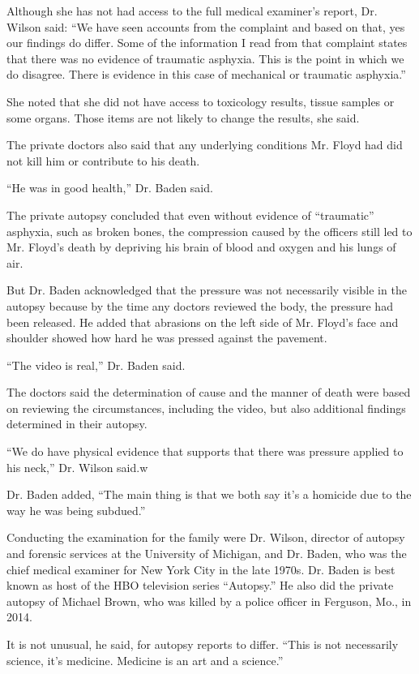 Although she has not had access to the full medical examiner's report,
Dr. Wilson said: ``We have seen accounts from the complaint and based on
that, yes our findings do differ. Some of the information I read from
that complaint states that there was no evidence of traumatic asphyxia.
This is the point in which we do disagree. There is evidence in this
case of mechanical or traumatic asphyxia.''

She noted that she did not have access to toxicology results, tissue
samples or some organs. Those items are not likely to change the
results, she said.

The private doctors also said that any underlying conditions Mr. Floyd
had did not kill him or contribute to his death.

``He was in good health,'' Dr. Baden said.

The private autopsy concluded that even without evidence of
``traumatic'' asphyxia, such as broken bones, the compression caused by
the officers still led to Mr. Floyd's death by depriving his brain of
blood and oxygen and his lungs of air.

But Dr. Baden acknowledged that the pressure was not necessarily visible
in the autopsy because by the time any doctors reviewed the body, the
pressure had been released. He added that abrasions on the left side of
Mr. Floyd's face and shoulder showed how hard he was pressed against the
pavement.

``The video is real,'' Dr. Baden said.

The doctors said the determination of cause and the manner of death were
based on reviewing the circumstances, including the video, but also
additional findings determined in their autopsy.

``We do have physical evidence that supports that there was pressure
applied to his neck,'' Dr. Wilson said.w

Dr. Baden added, ``The main thing is that we both say it's a homicide
due to the way he was being subdued.''

Conducting the examination for the family were Dr. Wilson, director of
autopsy and forensic services at the University of Michigan, and Dr.
Baden, who was the chief medical examiner for New York City in the late
1970s. Dr. Baden is best known as host of the HBO television series
``Autopsy.'' He also did the private autopsy of Michael Brown, who was
killed by a police officer in Ferguson, Mo., in 2014.

It is not unusual, he said, for autopsy reports to differ. ``This is not
necessarily science, it's medicine. Medicine is an art and a science.''

